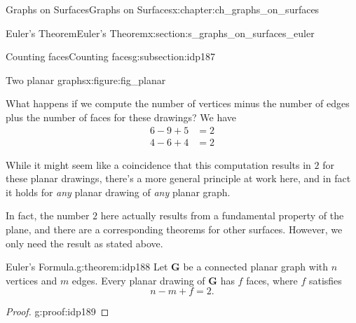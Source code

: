\documentclass[oneside,10pt,]{book}
\numberwithin{equation}{section}
\newcommand{\bfG}{\mathbf{G}}
\newcommand{\amp}{&}
\begin{document}
\begin{chapterptx}{Graphs on Surfaces}{}{Graphs on Surfaces}{}{}{x:chapter:ch_graphs_on_surfaces}
\begin{sectionptx}{Euler's Theorem}{}{Euler's Theorem}{}{}{x:section:s_graphs_on_surfaces_euler}
\begin{subsectionptx}{Counting faces}{}{Counting faces}{}{}{g:subsection:idp187}
\begin{figureptx}{Two planar graphs}{x:figure:fig_planar}{}
\begin{image}{0}{1}{0}
{
}%
\end{image}%
\tcblower
\end{figureptx}%
What happens if we compute the number of vertices minus the number of edges plus the number of faces for these drawings? We have%
\begin{align*}
6-9+5 \amp = 2\\
4-6+4 \amp =2
\end{align*}
%
\par
While it might seem like a coincidence that this computation results in \(2\) for these planar drawings, there's a more general principle at work here, and in fact it holds for \emph{any} planar drawing of \emph{any} planar graph.%
\par
In fact, the number \(2\) here actually results from a fundamental property of the plane, and there are a corresponding theorems for other surfaces. However, we only need the result as stated above.%
\begin{theorem}{Euler's Formula.}{}{g:theorem:idp188}%
%
Let \(\bfG\) be a connected planar graph with \(n\) vertices and \(m\) edges. Every planar drawing of \(\bfG\) has \(f\) faces, where \(f\) satisfies%
\begin{equation*}
n-m+f=2.
\end{equation*}
%
\end{theorem}
\begin{proof}{}{g:proof:idp189}

\end{proof}
\end{subsectionptx}
\end{sectionptx}
\end{chapterptx}
\end{document}
